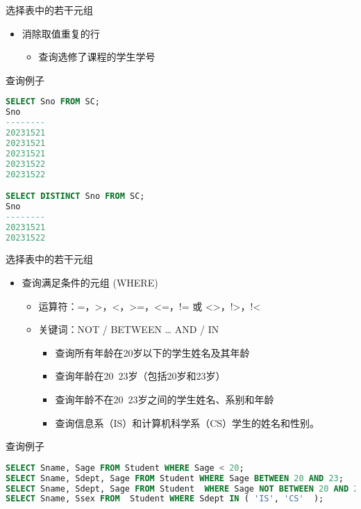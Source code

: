 \begin{frame}[fragile]{选择表中的若干元组}
\begin{itemize}
    \item 消除取值重复的行
    \begin{itemize}
        \item 查询选修了课程的学生学号
    \end{itemize}
\end{itemize}

\begin{block}{查询例子}
\begin{lstlisting}[language=SQL]
SELECT Sno FROM SC;
Sno
--------
20231521
20231521
20231521
20231522
20231522

SELECT DISTINCT Sno FROM SC;
Sno
--------
20231521
20231522

\end{lstlisting}
\end{block}
\end{frame}


\begin{frame}[fragile]{选择表中的若干元组}
\begin{itemize}
    \item 查询满足条件的元组 (WHERE)
    \begin{itemize}
        \item 运算符：=，>，<，>=，<=，!= 或 <>，!>，!<
        \item 关键词：NOT / BETWEEN …  AND / IN
    \begin{itemize}
        \item 查询所有年龄在20岁以下的学生姓名及其年龄
        \item 查询年龄在20~23岁（包括20岁和23岁）
        \item 查询年龄不在20~23岁之间的学生姓名、系别和年龄
        \item 查询信息系（IS）和计算机科学系（CS）学生的姓名和性别。
    \end{itemize}
    \end{itemize}
    
\end{itemize}

\begin{block}{查询例子}
\begin{lstlisting}[language=SQL]
SELECT Sname, Sage FROM Student WHERE Sage < 20;
SELECT Sname, Sdept, Sage FROM Student WHERE Sage BETWEEN 20 AND 23; 
SELECT Sname, Sdept, Sage FROM Student  WHERE Sage NOT BETWEEN 20 AND 23；
SELECT Sname, Ssex FROM  Student WHERE Sdept IN ( 'IS', 'CS'  );
\end{lstlisting}
\end{block}
\end{frame}



